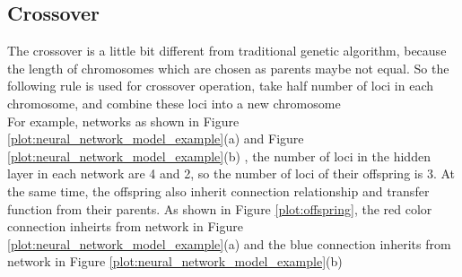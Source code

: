 \documentclass[smallextended]{svjour3}       %
\begin{document}
\begin{multicols}{2}
\begin{center}
\label{plot:ga_and_nn}
\end{center}

\subsection{Crossover}
  The crossover is a little bit different from traditional genetic algorithm,
because the length of chromosomes which are chosen as parents maybe  not
equal.  So the following rule is used for crossover operation,  take 
half number of loci in each chromosome, and combine these loci into a new
chromosome \\
  For example, networks as shown in Figure
\ref{plot:neural_network_model_example}(a) and
Figure \ref{plot:neural_network_model_example}(b) , the number of loci in the
hidden layer in each network are 4 and 2, so the number of loci of their
offspring is 3. At the same time, the offspring also inherit connection
relationship and transfer function from their parents. As shown in Figure
\ref{plot:offspring}, the red color connection inheirts from network in Figure
\ref{plot:neural_network_model_example}(a) and the blue connection inherits from
network in Figure \ref{plot:neural_network_model_example}(b)\\ 

\begin{center}
\end{center}
\end{multicols}
\end{document}
